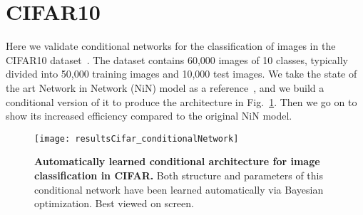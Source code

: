 \documentclass[thesis]{subfiles}
\begin{document}
	
	\section{CIFAR10}
	Here we validate conditional networks for the classification of images in the CIFAR10 dataset~\citep{CIFAR10}. 
	The dataset contains 60,000 images of 10 classes, typically divided into 50,000 training images and 10,000 test images. 
	We take the state of the art Network in Network (NiN) model 
	as a reference~\citep{Lin2013NiN}, and we build a conditional version of it to produce the architecture in Fig.~\ref{fig:Cifar_CondNet}. 
	Then we go on to show its increased efficiency compared to the original NiN model.
	
	\begin{figure}[tbp]
		\centerline{
			\texttt{[image: resultsCifar\_conditionalNetwork]}
		}
		\caption[Automatically learned conditional architecture for image classification in CIFAR]{{\bf Automatically learned conditional architecture for image classification in CIFAR.} Both structure and parameters of this conditional network have been learned automatically via Bayesian optimization.
			Best viewed on screen.}
		\label{fig:Cifar_CondNet}
	\end{figure}
	
\end{document}
